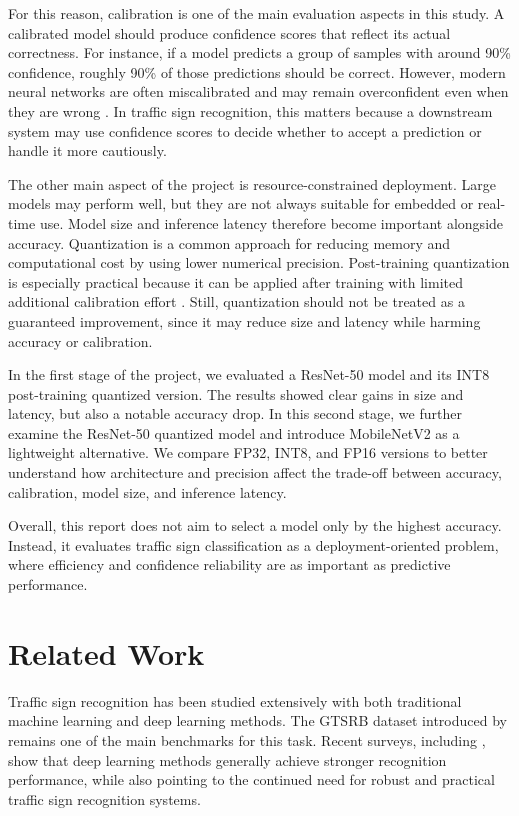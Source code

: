 \documentclass{article} %
\begin{document}
For this reason, calibration is one of the main evaluation aspects in this study. A calibrated model should produce confidence scores that reflect its actual correctness. For instance, if a model predicts a group of samples with around 90\% confidence, roughly 90\% of those predictions should be correct. However, modern neural networks are often miscalibrated and may remain overconfident even when they are wrong \citep{guo2017calibration}. In traffic sign recognition, this matters because a downstream system may use confidence scores to decide whether to accept a prediction or handle it more cautiously.

The other main aspect of the project is resource-constrained deployment. Large models may perform well, but they are not always suitable for embedded or real-time use. Model size and inference latency therefore become important alongside accuracy. Quantization is a common approach for reducing memory and computational cost by using lower numerical precision. Post-training quantization is especially practical because it can be applied after training with limited additional calibration effort \citep{hubara2021ptq}. Still, quantization should not be treated as a guaranteed improvement, since it may reduce size and latency while harming accuracy or calibration.

In the first stage of the project, we evaluated a ResNet-50 model and its INT8 post-training quantized version. The results showed clear gains in size and latency, but also a notable accuracy drop. In this second stage, we further examine the ResNet-50 quantized model and introduce MobileNetV2 as a lightweight alternative. We compare FP32, INT8, and FP16 versions to better understand how architecture and precision affect the trade-off between accuracy, calibration, model size, and inference latency.

Overall, this report does not aim to select a model only by the highest accuracy. Instead, it evaluates traffic sign classification as a deployment-oriented problem, where efficiency and confidence reliability are as important as predictive performance.

\section{Related Work}

Traffic sign recognition has been studied extensively with both traditional machine learning and deep learning methods. The GTSRB dataset introduced by \citet{stallkamp2011gtsrb} remains one of the main benchmarks for this task. Recent surveys, including \citet{lim2023review}, show that deep learning methods generally achieve stronger recognition performance, while also pointing to the continued need for robust and practical traffic sign recognition systems.
\end{document}
